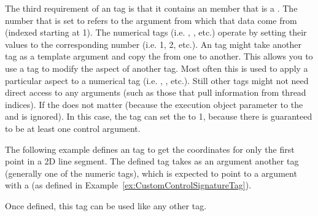 The third requirement of an \executionsignature tag is that it contains an  member that is a   .
The number that  is set to refers to the \controlsignature argument from which that data come from (indexed starting at 1).
The numerical \executionsignature tags (i.e. , , etc.) operate by setting their  values to the corresponding number (i.e. 1, 2, etc.).
An \executionsignature tag might take another tag as a template argument and copy the  from one to another.
This allows you to use a tag to modify the aspect of another tag.
Most often this is used to apply a particular aspect to a numerical \executionsignature tag (i.e. , , etc.).
Still other \executionsignature tags might not need direct access to any \controlsignature arguments (such as those that pull information from thread indices).
If the  does not matter (because the execution object parameter to the   and  is ignored).
In this case, the \executionsignature tag can set the  to 1, because there is guaranteed to be at least one control argument.

The following example defines an \executionsignature tag to get the coordinates for only the first point in a 2D line segment.
The defined tag takes as an argument another tag (generally one of the numeric tags), which is expected to point to a \controlsignature argument with a  (as defined in Example~\ref{ex:CustomControlSignatureTag}).


Once defined, this tag can be used like any other \executionsignature tag.



